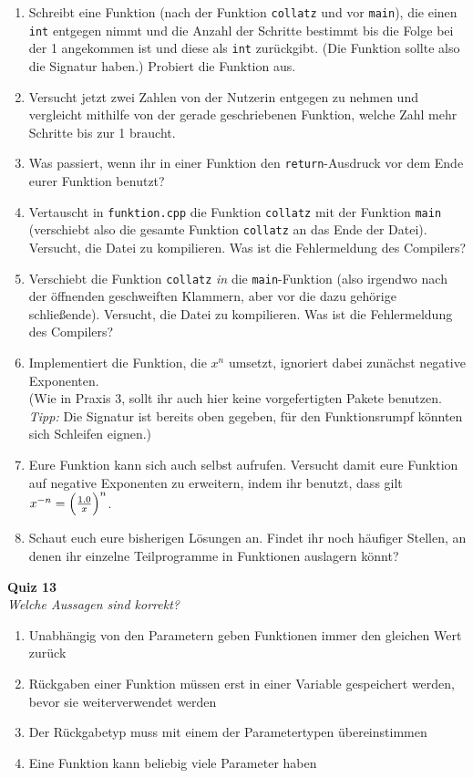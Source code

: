 \begin{spiel}
\begin{enumerate}
	\item Schreibt eine Funktion (nach der Funktion \texttt{collatz} und vor \texttt{main}), die einen \texttt{int} entgegen nimmt und die Anzahl der Schritte bestimmt bis die Folge bei der 1 angekommen ist und diese als \texttt{int} zurückgibt.
	(Die Funktion sollte also die Signatur  haben.)
	Probiert die Funktion aus.
	\item Versucht jetzt zwei Zahlen von der Nutzerin entgegen zu nehmen und vergleicht mithilfe von der gerade geschriebenen Funktion, welche Zahl mehr Schritte bis zur 1 braucht.
    \item Was passiert, wenn ihr in einer Funktion den \texttt{return}-Ausdruck vor dem Ende eurer Funktion benutzt?
    \item Vertauscht in \texttt{funktion.cpp} die Funktion \texttt{collatz} mit der Funktion \texttt{main} (verschiebt also die gesamte Funktion \texttt{collatz} an das Ende der Datei).
        Versucht, die Datei zu kompilieren.
        Was ist die Fehlermeldung des Compilers?
    \item Verschiebt die Funktion \texttt{collatz} \emph{in} die \texttt{main}-Funktion (also irgendwo nach der öffnenden geschweiften Klammern, aber vor die dazu gehörige schließende).
        Versucht, die Datei zu kompilieren. Was ist die Fehlermeldung des Compilers?
    \item Implementiert die Funktion, die $x^n$ umsetzt, ignoriert dabei zunächst negative Exponenten. \\
        (Wie in Praxis 3, sollt ihr auch hier keine vorgefertigten Pakete benutzen. \emph{Tipp:} Die Signatur ist bereits oben gegeben, für den Funktionsrumpf könnten sich Schleifen eignen.)
    \item Eure Funktion kann sich auch selbst aufrufen. Versucht damit eure Funktion auf negative Exponenten zu erweitern, indem ihr benutzt, dass gilt $x^{-n} = \Bigl(\frac{1.0}{x}\Bigr)^n$.
    \item Schaut euch eure bisherigen Lösungen an.
        Findet ihr noch häufiger Stellen, an denen ihr einzelne Teilprogramme in Funktionen auslagern könnt?
\end{enumerate}
\end{spiel}

\textbf{Quiz 13}\\
\textit{Welche Aussagen sind korrekt?}
\begin{enumerate}[label=\alph]
    \item Unabhängig von den Parametern geben Funktionen immer den gleichen Wert zurück
    \item Rückgaben einer Funktion müssen erst in einer Variable gespeichert werden, bevor sie weiterverwendet werden
    \item Der Rückgabetyp muss mit einem der Parametertypen übereinstimmen
    \item Eine Funktion kann beliebig viele Parameter haben
\end{enumerate}

